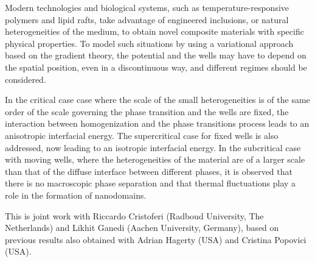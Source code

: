 \mypage
{}
\begin{myabstract}
Modern technologies and biological systems, such as temperature-responsive polymers and lipid rafts, take advantage of engineered inclusions, or natural heterogeneities of the medium, to obtain novel composite materials with specific physical properties. To model such situations by using a variational approach based on the gradient theory, the potential and the wells may have to depend on the spatial position, even in a discontinuous way, and different regimes should be considered.

In the critical case case where the scale of the small heterogeneities is of the same order of the scale governing the phase transition and the wells are fixed, the interaction between homogenization and the phase transitions process leads to an an\-isotropic interfacial energy. The supercritical case for fixed wells is also addressed, now leading to an isotropic interfacial energy. In the subcritical case with moving wells, where the heterogeneities of the material are of a larger scale than that of the diffuse interface between different phases, it is observed that there is no macroscopic phase separation and that thermal fluctuations play a role in the formation of nanodomains.

This is joint work with Riccardo Cristoferi (Radboud University, The Netherlands) and Likhit Ganedi (Aachen University, Germany), based on previous results also obtained with Adrian Hagerty (USA) and Cristina Popovici (USA).
\end{myabstract}


